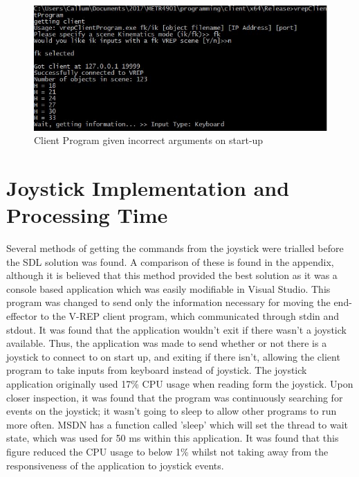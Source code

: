 \documentclass[12pt,openany,a4paper]{book}
\begin{document}
\begin{center}
\begin{figure}[htb]
  \includegraphics[width=\linewidth]{client_prompted_start_up.jpg}
\caption{ Client Program given incorrect arguments on start-up }
\end{figure}
\end{center}

\section{Joystick Implementation and Processing Time}
Several methods of getting the commands from the joystick were trialled before the SDL solution was found. A comparison of these is found in the appendix, although it is believed that this method provided the best solution as it was a console based application which was easily modifiable in Visual Studio. This program was changed to send only the information necessary for moving the end-effector to the V-REP client program, which communicated through stdin and stdout. It was found that the application wouldn't exit if there wasn't a joystick available. Thus, the application was made to send whether or not there is a joystick to connect to on start up, and exiting if there isn't, allowing the client program to take inputs from keyboard instead of joystick. The joystick application originally used 17\% CPU usage when reading form the joystick. Upon closer inspection, it was found that the program was continuously searching for events on the joystick; it wasn't going to sleep to allow other programs to run more often. MSDN has a function called 'sleep' which will set the thread to wait state, which was used for 50 ms within this application. It was found that this figure reduced the CPU usage to below 1\% whilst not taking away from the responsiveness of the application to joystick events.
\end{document}

